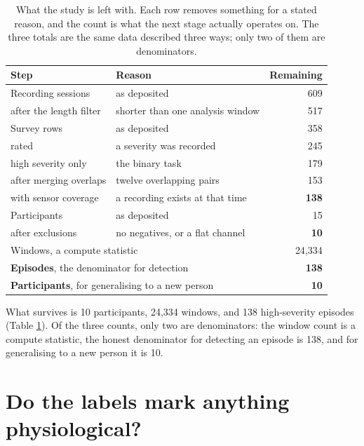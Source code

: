 \documentclass{article}
\begin{document}
\begin{table}[t]
\caption{What the study is left with. Each row removes something for a stated
reason, and the count is what the next stage actually operates on. The three
totals are the same data described three ways; only two of them are
denominators.}
\label{tab:attrition}
\centering
\begin{tabular}{llr}
\toprule
Step & Reason & Remaining \\
\midrule
Recording sessions            & as deposited                     & 609 \\
\quad after the length filter & shorter than one analysis window & 517 \\
\addlinespace
Survey rows                   & as deposited                     & 358 \\
\quad rated                   & a severity was recorded          & 245 \\
\quad high severity only      & the binary task                  & 179 \\
\quad after merging overlaps  & twelve overlapping pairs         & 153 \\
\quad with sensor coverage    & a recording exists at that time  & \textbf{138} \\
\addlinespace
Participants                  & as deposited                     & 15 \\
\quad after exclusions        & no negatives, or a flat channel  & \textbf{10} \\
\midrule
\multicolumn{2}{l}{Windows, a compute statistic} & 24{,}334 \\
\multicolumn{2}{l}{\textbf{Episodes}, the denominator for detection} & \textbf{138} \\
\multicolumn{2}{l}{\textbf{Participants}, for generalising to a new person} & \textbf{10} \\
\bottomrule
\end{tabular}
\end{table}

What survives is 10 participants, 24{,}334 windows, and 138
high-severity episodes (Table \ref{tab:attrition}). Of the three counts, only two are denominators: the
window count is a compute statistic, the honest denominator for detecting an
episode is 138, and for generalising to a new person it is 10.

\section{Do the labels mark anything physiological?}
\label{sec:labels}
\end{document}
